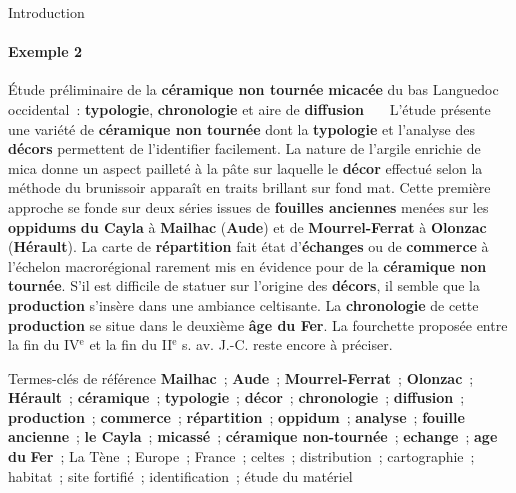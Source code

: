   \begin{frame}{Introduction}\framesubtitle{Exemple 2}
    \vspace{-.33em}
    \begin{exampleblock}{\small
      Étude préliminaire de la \textbf{céramique non tournée}
      \textbf{micacée} du bas Languedoc occidental~: \textbf{typologie},
      \textbf{chronologie} et aire de \textbf{diffusion}
    }\justifying\small
      ~~~L'étude présente une variété de \textbf{céramique non tournée} dont la
      \textbf{typologie} et l'analyse des \textbf{décors} permettent de
      l'identifier facilement. La nature de l'argile enrichie de mica donne un
      aspect pailleté à la pâte sur laquelle le \textbf{décor} effectué selon
      la méthode du brunissoir apparaît en traits brillant sur fond mat. Cette
      première approche se fonde sur deux séries issues de \textbf{fouilles
      anciennes} menées sur les \textbf{oppidums} \textbf{du Cayla} à
      \textbf{Mailhac} (\textbf{Aude}) et de \textbf{Mourrel-Ferrat} à
      \textbf{Olonzac} (\textbf{Hérault}). La carte de
      \textbf{répartition} fait état d'\textbf{échanges} ou de
      \textbf{commerce} à l'échelon macrorégional rarement mis en évidence pour
      de la \textbf{céramique non tournée}. S'il est difficile de statuer sur
      l'origine des \textbf{décors}, il semble que la \textbf{production}
      s'insère dans une ambiance celtisante. La \textbf{chronologie} de cette
      \textbf{production} se situe dans le deuxième \textbf{âge du Fer}. La
      fourchette proposée entre la fin du IV$^\text{e}$ et la fin du II$^\text{e}$
      s. av. J.-C. reste encore à préciser.

      \begin{exampleblock}{\small Termes-clés de référence}\justifying\small
        \textbf{Mailhac}~; \textbf{Aude}~; \textbf{Mourrel-Ferrat}~;
        \textbf{Olonzac}~; \textbf{Hérault}~; \textbf{céramique}~;
        \textbf{typologie}~; \textbf{décor}~; \textbf{chronologie}~;
        \textbf{diffusion}~; \textbf{production}~; \textbf{commerce}~;
        \textbf{répartition}~; \textbf{oppidum}~; \textbf{analyse}~;
        \textbf{fouille ancienne}~; \textbf{le Cayla}~;
        \textbf{micassé}~; \textbf{céramique non-tournée}~;
        \textbf{echange}~; \textbf{age du} \textbf{Fer}~; La Tène~;
        Europe~; France~; celtes~; distribution~; cartographie~; habitat~; site
        fortifié~; identification~; étude du matériel
      \end{exampleblock}
    \end{exampleblock}
  \end{frame}


